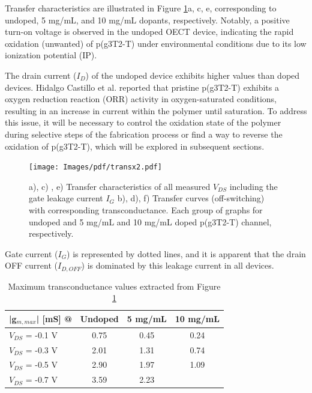 Transfer characteristics are illustrated in Figure \ref{fig:transx2}a, c, e, corresponding to undoped, 5 mg/mL, and 10 mg/mL dopants, respectively. Notably, a positive turn-on voltage is observed in the undoped OECT device, indicating the rapid oxidation (unwanted) of p(g3T2-T) under environmental conditions due to its low ionization potential (IP). 

The drain current ($I_{D}$) of the undoped device exhibits higher values than doped devices. Hidalgo Castillo et al.  \cite{hidalgocastilloSimultaneousPerformanceStability2022a} reported that pristine p(g3T2-T) exhibits a oxygen reduction reaction (ORR) activity in oxygen-saturated conditions, resulting in an increase in current within the polymer until saturation. To address this issue, it will be necessary to control the oxidation state of the polymer during selective steps of the fabrication process or find a way to reverse the oxidation of p(g3T2-T), which will be explored in subsequent sections.

\begin{figure}[!ht]
    \centering
    \texttt{[image: Images/pdf/transx2.pdf]} 
\caption[Transfer characteristics and transconductance at different doping levels and $V_{DS}$]{a), c) , e) Transfer characteristics of all measured $V_{DS}$ including the gate leakage current $I_{G}$ b), d), f) Transfer curves (off-switching) with corresponding transconductance. Each group of graphs for undoped and 5 mg/mL and 10 mg/mL doped p(g3T2-T) channel, respectively.}
    \label{fig:transx2}
\end{figure}
    

Gate current ($I_{G}$) is represented by dotted lines, and it is apparent that the drain OFF current ($I_{D,OFF}$) is dominated by this leakage current in all devices. %

\begin{table}[ht]
\centering
\caption{Maximum transconductance values extracted from Figure \ref{fig:transx2}}
\begin{tabular}{l|c|c|c}
|g$_{m,max}$| [mS] @ & Undoped & 5 mg/mL & 10 mg/mL \\\hline
$V_{DS}$ = -0.1 V & 0.75 & 0.45 & 0.24\\
$V_{DS}$ = -0.3 V & 2.01 & 1.31 & 0.74\\
$V_{DS}$ = -0.5 V & 2.90 & 1.97 & 1.09\\
$V_{DS}$ = -0.7 V & 3.59 & 2.23 & \\ \hline
\end{tabular}
\label{tab:trans}
\end{table}


